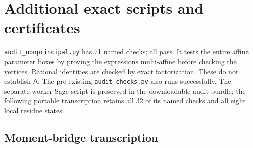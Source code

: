 \documentclass[12pt]{article}
\begin{document}
\section{Additional exact scripts and certificates}
\texttt{audit\_nonprincipal.py} has 71 named checks; all pass.
It tests the entire affine parameter boxes by proving the expressions
multi-affine before checking the vertices.  Rational identities are
checked by exact factorization.  These do not establish \(\mathsf A\).
The pre-existing \texttt{audit\_checks.py} also runs successfully.
The separate worker Sage script is preserved in the downloadable
audit bundle; the following portable transcription retains all
32 of its named checks and all eight local residue states.
\subsection{Moment-bridge transcription}
\end{document}
